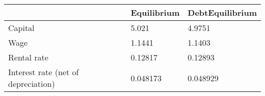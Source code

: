 \begin{tabular}{lll}
& Equilibrium & DebtEquilibrium \\ 
\hline 
Capital & 5.021 & 4.9751 \\ 
Wage & 1.1441 & 1.1403 \\ 
Rental rate & 0.12817 & 0.12893 \\ 
Interest rate (net of depreciation) & 0.048173 & 0.048929 \\ 
\hline 
\end{tabular}